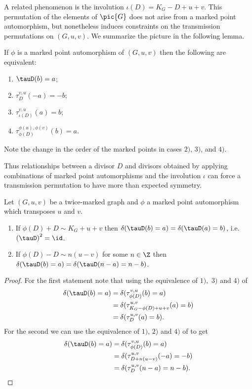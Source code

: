 A related phenomenon is the involution $\iota(D) = K_G-D+u+v$. This permutation of the elements of $\pic{G}$ does not arise from a marked point automorphism, but nonetheless induces constraints on the transmission permutations on $(G,u,v)$. We summarize the picture in the following lemma.

\begin{lemma}\label{lem:mpIds}
    If $\phi$ is a marked point automorphism of $(G,u,v)$ then the following are equivalent:
    \begin{enumerate}[label = \arabic*)]
        \item $\tauD(b) = a$;
        \item $\tau_D^{v,u}(-a) = -b$;
        \item $\tau_{\iota(D)}^{v,u}(a) = b$;
        \item $\tau_{\phi(D)}^{\phi(u),\phi(v)}(b) = a$.
    \end{enumerate}
    Note the change in the order of the marked points in cases $2)$, $3)$, and $4)$.
\end{lemma}

Thus relationships between a divisor $D$ and divisors obtained by applying combinations of marked point automorphisms and the involution $\iota$ can force a transmission permutation to have more than expected symmetry.

\begin{lemma}\label{lem-tauSyms}
    Let $(G,u,v)$ be a twice-marked graph and $\phi$ a marked point automorphism which transposes $u$ and $v$.
    \begin{enumerate}[label = \arabic*)]
        \item If $\phi(D) + D \sim K_G + u+v$ then $\delta(\tauD(b) = a) = \delta(\tauD(a) = b)$, i.e. $\left(\tauD\right)^2 = \id$.
        \item If $\phi(D) -D \sim n(u-v)$ for some $n \in \Z$ then $\delta(\tauD(b) = a)=\delta(\tauD(n-a) = n-b)$.
    \end{enumerate}
\end{lemma}

\begin{proof}
    For the first statement note that using the equivalence of $1),$ $3)$ and $4)$ of 
    \begin{align*}
        \delta(\tauD(b) = a) &= \delta(\tau_{\phi(D)}^{v,u}(b) = a)\\
        &=\delta(\tau_{K_G-\phi(D)+u+v}^{u,v}(a) = b)\\
        &=\delta(\tau_{D}^{u,v}(a) = b).
    \end{align*}
    For the second we can use the equivalence of $1)$, $2)$ and $4)$ of  to get
    \begin{align*}
        \delta(\tauD(b) = a) & = \delta(\tau_{\phi(D)}^{v,u}(b) = a)\\
        &=\delta(\tau_{D+n(u-v)}^{u,v}(-a) = -b)\\
        &=\delta(\tau_{D}^{u,v}(n-a) = n-b). \qedhere
    \end{align*}
\end{proof}

